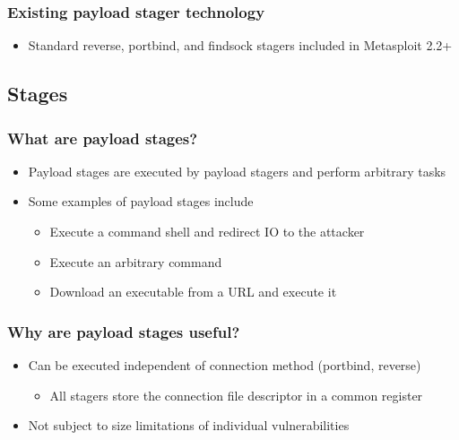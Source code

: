 \documentclass{beamer}
\newenvironment{sitemize}{\vspace{1mm}\begin{itemize}\itemsep 4pt\small}{\end{itemize}}
\begin{document}
\begin{frame}[t]
    \frametitle{Existing payload stager technology}

    \begin{sitemize}
        \item Standard reverse, portbind, and findsock stagers
        included in Metasploit 2.2+

    \end{sitemize}
\end{frame}

\subsection{Stages}
\begin{frame}[t]
    \frametitle{What are payload stages?}

    \begin{sitemize}
        \item Payload stages are executed by payload stagers and
        perform arbitrary tasks

        \pause
        \item Some examples of payload stages include
        \begin{sitemize}
            \item Execute a command shell and redirect IO to the
            attacker
            \item Execute an arbitrary command
            \item Download an executable from a URL and execute it
        \end{sitemize}
    \end{sitemize}
\end{frame}

\begin{frame}[t]
    \frametitle{Why are payload stages useful?}

    \begin{sitemize}
        \item Can be executed independent of connection method
        (portbind, reverse)
        \begin{sitemize}
            \item All stagers store the connection file descriptor
            in a common register
        \end{sitemize}

        \pause
        \item Not subject to size limitations of individual
        vulnerabilities
    \end{sitemize}
\end{frame}
\end{document}
